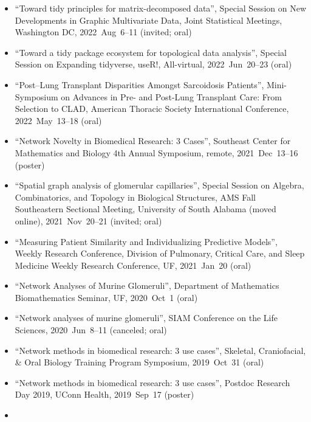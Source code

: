 \documentclass[10pt,a4paper]{article}
\begin{document}
\begin{itemize}[label=$\circ$,nolistsep]
\item
``Toward tidy principles for matrix-decomposed data'', Special Session on New Developments in Graphic Multivariate Data, Joint Statistical Meetings, Washington DC, 2022~Aug~6--11 (invited; oral)
\item
``Toward a tidy package ecosystem for topological data analysis'', Special Session on Expanding {\sffamily tidyverse}, useR!, All-virtual, 2022~Jun~20--23 (oral)
\item
``Post--Lung Transplant Disparities Amongst Sarcoidosis Patients'', Mini-Symposium on Advances in Pre- and Post-Lung Transplant Care: From Selection to CLAD, American Thoracic Society International Conference, 2022~May~13--18 (oral)
\item
``Network Novelty in Biomedical Research: 3 Cases'', Southeast Center for Mathematics and Biology 4th Annual Symposium, remote, 2021~Dec~13--16 (poster)
\item
``Spatial graph analysis of glomerular capillaries'', Special Session on Algebra, Combinatorics, and Topology in Biological Structures, AMS Fall Southeastern Sectional Meeting, University of South Alabama (moved online), 2021~Nov~20--21 (invited; oral)
\item
``Measuring Patient Similarity and Individualizing Predictive Models'', Weekly Research Conference, Division of Pulmonary, Critical Care, and Sleep Medicine Weekly Research Conference, UF, 2021~Jan~20 (oral)
\item
``Network Analyses of Murine Glomeruli'', Department of Mathematics Biomathematics Seminar, UF, 2020~Oct~1 (oral)
\item
``Network analyses of murine glomeruli'', SIAM Conference on the Life Sciences, 2020~Jun~8--11 (canceled; oral)
\item
``Network methods in biomedical research: 3 use cases'', Skeletal, Craniofacial, \& Oral Biology Training Program Symposium, 2019~Oct~31 (oral)
\item
``Network methods in biomedical research: 3 use cases'', Postdoc Research Day 2019, UConn Health, 2019~Sep~17 (poster)
\item

\end{itemize}
\end{document}

